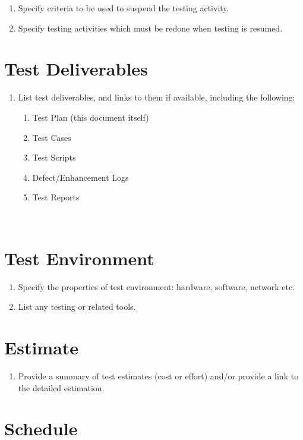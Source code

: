 \begin{enumerate}
	\item Specify criteria to be used to suspend the testing activity.
	\item Specify testing activities which must be redone when testing is resumed.
\end{enumerate}

\section{Test Deliverables}

\begin{enumerate}
	\item List test deliverables, and links to them if available, including the following:

\begin{enumerate}
	\item Test Plan (this document itself)
	\item Test Cases
	\item Test Scripts
	\item Defect/Enhancement Logs
	\item Test Reports
\end{enumerate}
\end{enumerate}
~
\section{Test Environment}

\begin{enumerate}
	\item Specify the properties of test environment: hardware, software, network etc.
	\item List any testing or related tools.
\end{enumerate}

\section{Estimate}

\begin{enumerate}
	\item Provide a summary of test estimates (cost or effort) and/or provide a link to the detailed estimation.
\end{enumerate}

\section{Schedule}

